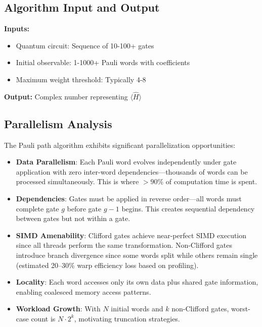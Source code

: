 \documentclass[11pt, a4paper]{article}
\begin{document}
\subsection{Algorithm Input and Output}

\textbf{Inputs:}
\begin{itemize}
    \item Quantum circuit: Sequence of 10-100+ gates
    \item Initial observable: 1-1000+ Pauli words with coefficients
    \item Maximum weight threshold: Typically 4-8
\end{itemize}

\noindent\textbf{Output:} Complex number representing $\langle \hat{H} \rangle$

\subsection{Parallelism Analysis}

The Pauli path algorithm exhibits significant parallelization opportunities:

\begin{itemize}
    \item \textbf{Data Parallelism}: Each Pauli word evolves independently under gate application with zero inter-word dependencies---thousands of words can be processed simultaneously. This is where $>90\%$ of computation time is spent.
    
    \item \textbf{Dependencies}: Gates must be applied in reverse order---all words must complete gate $g$ before gate $g-1$ begins. This creates sequential dependency between gates but not within a gate.
    
    \item \textbf{SIMD Amenability}: Clifford gates achieve near-perfect SIMD execution since all threads perform the same transformation. Non-Clifford gates introduce branch divergence since some words split while others remain single (estimated 20--30\% warp efficiency loss based on profiling).
    
    \item \textbf{Locality}: Each word accesses only its own data plus shared gate information, enabling coalesced memory access patterns.
    
    \item \textbf{Workload Growth}: With $N$ initial words and $k$ non-Clifford gates, worst-case count is $N \cdot 2^k$, motivating truncation strategies.
\end{itemize}
\end{document}
